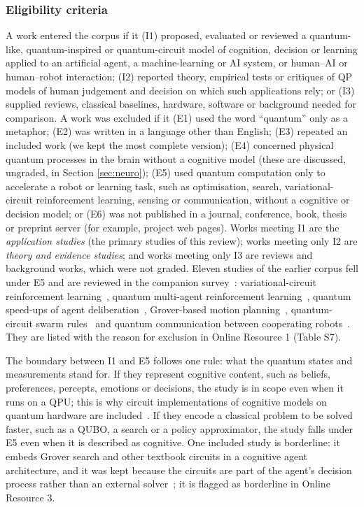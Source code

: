 \documentclass[pdflatex,sn-basic]{sn-jnl}
\begin{document}
\subsubsection{Eligibility criteria}\label{sec:criteria}
A work entered the corpus if it (I1) proposed, evaluated or reviewed a quantum-like, quantum-inspired or quantum-circuit model of cognition, decision or learning applied to an artificial agent, a machine-learning or AI system, or human--AI or human--robot interaction; (I2) reported theory, empirical tests or critiques of QP models of human judgement and decision on which such applications rely; or (I3) supplied reviews, classical baselines, hardware, software or background needed for comparison. A work was excluded if it (E1) used the word ``quantum'' only as a metaphor; (E2) was written in a language other than English; (E3) repeated an included work (we kept the most complete version); (E4) concerned physical quantum processes in the brain without a cognitive model (these are discussed, ungraded, in Section \ref{sec:neuro}); (E5) used quantum computation only to accelerate a robot or learning task, such as optimisation, search, variational-circuit reinforcement learning, sensing or communication, without a cognitive or decision model; or (E6) was not published in a journal, conference, book, thesis or preprint server (for example, project web pages). Works meeting I1 are the \emph{application studies} (the primary studies of this review); works meeting only I2 are \emph{theory and evidence studies}; and works meeting only I3 are reviews and background works, which were not graded. Eleven studies of the earlier corpus fell under E5 and are reviewed in the companion survey~\citep{Guru2026}: variational-circuit reinforcement learning~\citep{Chen2020,Jerbi2021,Skolik2022,Acuto2022,Sinha2023,Hohenfeld2024}, quantum multi-agent reinforcement learning~\citep{Yun2022}, quantum speed-ups of agent deliberation~\citep{Paparo2014}, Grover-based motion planning~\citep{Chella2022}, quantum-circuit swarm rules~\citep{Mannone2022} and quantum communication between cooperating robots~\citep{Khoshnoud2020}. They are listed with the reason for exclusion in Online Resource 1 (Table S7).

The boundary between I1 and E5 follows one rule: what the quantum states and measurements stand for. If they represent cognitive content, such as beliefs, preferences, percepts, emotions or decisions, the study is in scope even when it runs on a QPU; this is why circuit implementations of cognitive models on quantum hardware are included~\citep{Widdows2023}. If they encode a classical problem to be solved faster, such as a QUBO, a search or a policy approximator, the study falls under E5 even when it is described as cognitive. One included study is borderline: it embeds Grover search and other textbook circuits in a cognitive agent architecture, and it was kept because the circuits are part of the agent's decision process rather than an external solver~\citep{Daglarli2025}; it is flagged as borderline in Online Resource 3.
\end{document}
